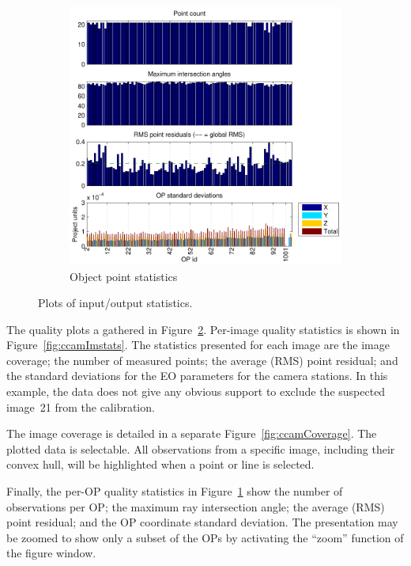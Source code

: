 \documentclass{article}
\begin{document}
\begin{figure}
\begin{subfigure}[b]{0.3\textwidth}
    \includegraphics[width=\textwidth]{ill/ccamopstats}
    \caption{Object point statistics}
    \label{fig:ccamOPstats}
  \end{subfigure}
  \caption{Plots of input/output statistics.}\label{fig:ccamQuality}
\end{figure}

The quality plots a gathered in Figure~\ref{fig:ccamQuality}.
Per-image quality statistics is shown in Figure~\ref{fig:ccamImstats}.
The statistics presented for each image are the image coverage; the
number of measured points; the average (RMS) point residual; and the
standard deviations for the EO parameters for the camera stations. In
this example, the data does not give any obvious support to exclude
the suspected image~21 from the calibration.

The image coverage is detailed in a separate
Figure~\ref{fig:ccamCoverage}. The plotted data is selectable. All
observations from a specific image, including their convex hull, will
be highlighted when a point or line is selected.

Finally, the per-OP quality statistics in Figure~\ref{fig:ccamOPstats}
show the number of observations per OP; the maximum ray intersection
angle; the average (RMS) point residual; and the OP coordinate
standard deviation. The presentation may be zoomed to show only a
subset of the OPs by activating the ``zoom'' function of the figure
window.
\end{document}
